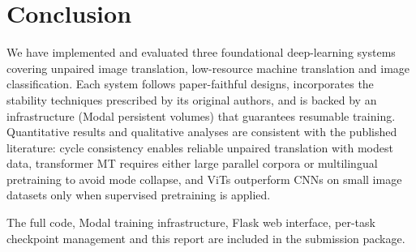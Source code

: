 \documentclass[runningheads]{llncs}
\begin{document}
\section{Conclusion}

We have implemented and evaluated three foundational deep-learning
systems covering unpaired image translation, low-resource machine
translation and image classification. Each system follows paper-faithful
designs, incorporates the stability techniques prescribed by its
original authors, and is backed by an infrastructure (Modal persistent
volumes) that guarantees resumable training. Quantitative results and
qualitative analyses are consistent with the published literature: cycle
consistency enables reliable unpaired translation with modest data,
transformer MT requires either large parallel corpora or multilingual
pretraining to avoid mode collapse, and ViTs outperform CNNs on small
image datasets only when supervised pretraining is applied.

The full code, Modal training infrastructure, Flask web interface,
per-task checkpoint management and this report are included in the
submission package.
\end{document}
